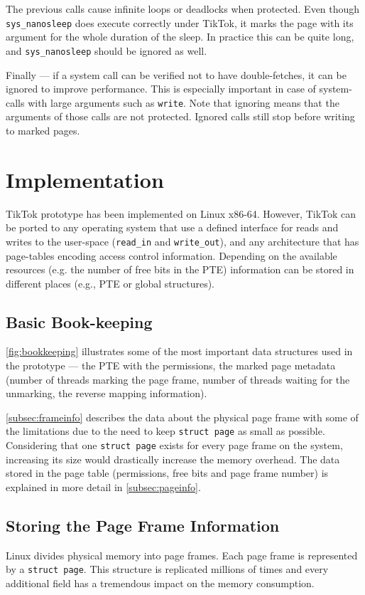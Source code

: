 \documentclass[conference]{IEEEtran}
\newcommand{\sysname}{TikTok}
\begin{document}
The previous calls cause infinite loops or deadlocks when protected. Even though
\texttt{sys\_nanosleep} does execute correctly under \sysname{}, it marks the page
with its argument for the whole duration of the sleep. In practice this can be
quite long, and \texttt{sys\_nanosleep} should be ignored as well.

Finally --- if a system call can be verified not to have double-fetches, it can
be ignored to improve performance. This is especially important in case of
system-calls with large arguments such as \texttt{write}. Note that ignoring
means that the arguments of those calls are not protected. Ignored calls
still stop before writing to marked pages.


\section{Implementation}
\label{sec:implementation}

\sysname{} prototype has been implemented on Linux x86-64. However, \sysname{} can be
ported to any operating system that use a defined interface for reads and
writes to the user-space (\texttt{read\_in} and \texttt{write\_out}), and any
architecture that has page-tables encoding access control information. Depending
on the available resources (e.g. the number of free bits in the PTE) information
can be stored in different places (e.g., PTE or global structures).

\subsection{Basic Book-keeping}
\autoref{fig:bookkeeping} illustrates some of the most important data structures
used in the prototype --- the PTE with the permissions, the marked page metadata
(number of threads marking the page frame, number of threads waiting for the
unmarking, the reverse mapping information). 

\autoref{subsec:frameinfo} describes the data about the physical page frame with
some of the limitations due to the need to keep \texttt{struct page} as small as
possible. Considering that one \texttt{struct page} exists for every page frame
on the system, increasing its size would drastically increase the memory
overhead.  The data stored in the page table (permissions, free bits and page
frame number) is explained in more detail in \autoref{subsec:pageinfo}.

\subsection{Storing the Page Frame Information}
\label{subsec:frameinfo}
Linux divides physical memory into page frames. Each page frame is represented
by a \texttt{struct page}. This structure is replicated millions of times and
every additional field has a tremendous impact on the memory consumption.
\end{document}
